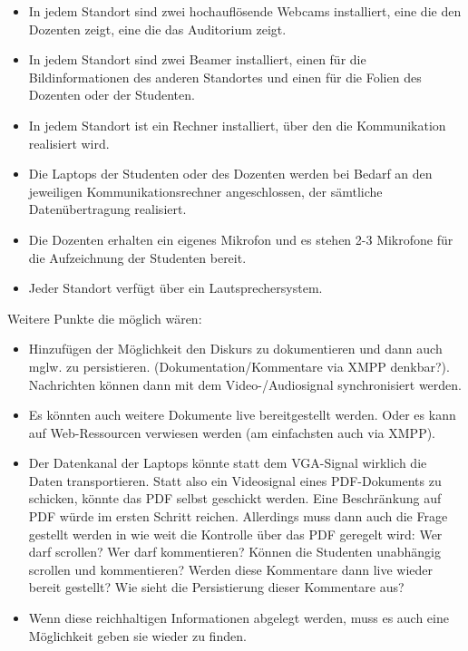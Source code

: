 \begin{itemize}

	\item In jedem Standort sind zwei hochauflösende Webcams installiert, eine die den Dozenten zeigt, eine die das Auditorium zeigt.
	\item In jedem Standort sind zwei Beamer installiert, einen für die Bildinformationen des anderen Standortes und einen für die Folien des Dozenten oder der Studenten.
	\item In jedem Standort ist ein Rechner installiert, über den die Kommunikation realisiert wird.
	\item Die Laptops der Studenten oder des Dozenten werden bei Bedarf an den jeweiligen Kommunikationsrechner angeschlossen, der sämtliche Datenübertragung realisiert.
	\item Die Dozenten erhalten ein eigenes Mikrofon und es stehen 2-3 Mikrofone für die Aufzeichnung der Studenten bereit.
	\item Jeder Standort verfügt über ein Lautsprechersystem.

\end{itemize}

Weitere Punkte die möglich wären:
\begin{itemize}

  \item Hinzufügen der Möglichkeit den Diskurs zu dokumentieren und dann auch mglw. zu persistieren. (Dokumentation/Kommentare via XMPP denkbar?). Nachrichten können dann mit dem Video-/Audiosignal synchronisiert werden.
  \item Es könnten auch weitere Dokumente live bereitgestellt werden. Oder es kann auf Web-Ressourcen verwiesen werden (am einfachsten auch via XMPP).
  \item Der Datenkanal der Laptops könnte statt dem VGA-Signal wirklich die Daten transportieren. Statt also ein Videosignal eines PDF-Dokuments zu schicken, könnte das PDF selbst geschickt werden. Eine Beschränkung auf PDF würde im ersten Schritt reichen. Allerdings muss dann auch die Frage gestellt werden in wie weit die Kontrolle über das PDF geregelt wird: Wer darf scrollen? Wer darf kommentieren? Können die Studenten unabhängig scrollen und kommentieren? Werden diese Kommentare dann live wieder bereit gestellt? Wie sieht die Persistierung dieser Kommentare aus?
  \item Wenn diese reichhaltigen Informationen abgelegt werden, muss es auch eine Möglichkeit geben sie wieder zu finden.

\end{itemize}

